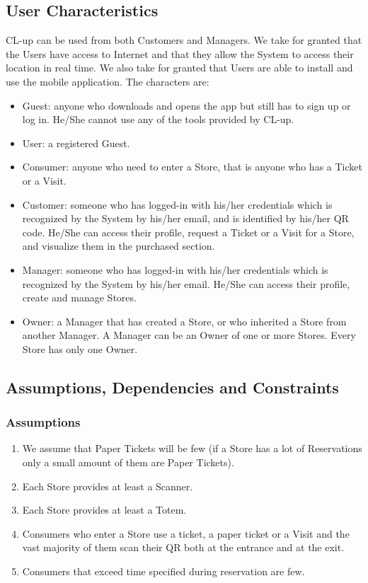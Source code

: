 \documentclass[a4paper, 12pt, oneside]{article}
\begin{document}
\subsection{User Characteristics}
CL-up can be used from both Customers and Managers. We take for granted that the Users have access to Internet and that they allow the System to access their location in real time. We also take for granted that Users are able to install and use the mobile application. 
The characters are:
\begin{itemize}
    \item Guest: anyone who downloads and opens the app but still has to sign up or log in. He/She cannot use any of the tools provided by CL-up.
    \item User: a registered Guest.
    \item Consumer: anyone who need to enter a Store, that is anyone who has a Ticket or a Visit. %
    \item Customer: someone who has logged-in with his/her credentials which is recognized by the System by his/her email, and is identified by his/her QR code. He/She can access their profile, request a Ticket or a Visit for a Store, and visualize them in the purchased section. 
    \item Manager: someone who has logged-in with his/her credentials  which is recognized by the System by his/her email. He/She can access their profile, create and manage Stores.
    \item Owner: a Manager that has created a Store, or who inherited a Store from another Manager. A Manager can be an Owner of one or more Stores. Every Store has only one Owner.
    
\end{itemize}
\subsection{Assumptions, Dependencies and Constraints}
\subsubsection{Assumptions}
\begin{enumerate}[label={DA.\arabic{*}}]
    \item \label{dom:fewPaperTickets}We assume that Paper Tickets will be few (if a Store has a lot of Reservations only a small amount of them are Paper Tickets).
    \item \label{dom:machineScanning}Each Store provides at least a Scanner.
    \item \label{dom:machinePaperTicket}Each Store provides at least a Totem.
    \item \label{dom:consumerAccessStore}Consumers who enter a Store use a ticket, a paper ticket or a Visit and the vast majority of them scan their QR both at the entrance and at the exit.
    \item \label{dom:consumerExceedDuration}Consumers that exceed time specified during reservation are few.
    
\end{enumerate}
\end{document}
